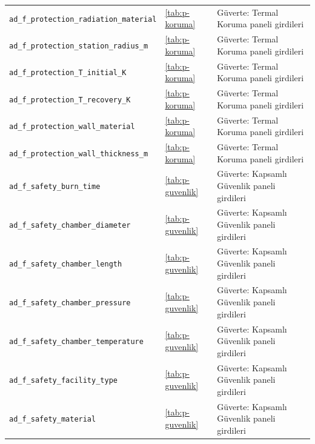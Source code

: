 \documentclass[11pt,a4paper]{article}
\begin{document}
{\begin{longtable}{@{}>{\raggedright\arraybackslash}p{5.2cm}p{1.4cm}>{\raggedright\arraybackslash}p{7.4cm}@{}}
\texttt{ad\_\allowbreak{}f\_\allowbreak{}protection\_\allowbreak{}radiation\_\allowbreak{}material} & \ref{tab:p-koruma} & Güverte: Termal Koruma paneli girdileri \\
\texttt{ad\_\allowbreak{}f\_\allowbreak{}protection\_\allowbreak{}station\_\allowbreak{}radius\_\allowbreak{}m} & \ref{tab:p-koruma} & Güverte: Termal Koruma paneli girdileri \\
\texttt{ad\_\allowbreak{}f\_\allowbreak{}protection\_\allowbreak{}T\_\allowbreak{}initial\_\allowbreak{}K} & \ref{tab:p-koruma} & Güverte: Termal Koruma paneli girdileri \\
\texttt{ad\_\allowbreak{}f\_\allowbreak{}protection\_\allowbreak{}T\_\allowbreak{}recovery\_\allowbreak{}K} & \ref{tab:p-koruma} & Güverte: Termal Koruma paneli girdileri \\
\texttt{ad\_\allowbreak{}f\_\allowbreak{}protection\_\allowbreak{}wall\_\allowbreak{}material} & \ref{tab:p-koruma} & Güverte: Termal Koruma paneli girdileri \\
\texttt{ad\_\allowbreak{}f\_\allowbreak{}protection\_\allowbreak{}wall\_\allowbreak{}thickness\_\allowbreak{}m} & \ref{tab:p-koruma} & Güverte: Termal Koruma paneli girdileri \\
\texttt{ad\_\allowbreak{}f\_\allowbreak{}safety\_\allowbreak{}burn\_\allowbreak{}time} & \ref{tab:p-guvenlik} & Güverte: Kapsamlı Güvenlik paneli girdileri \\
\texttt{ad\_\allowbreak{}f\_\allowbreak{}safety\_\allowbreak{}chamber\_\allowbreak{}diameter} & \ref{tab:p-guvenlik} & Güverte: Kapsamlı Güvenlik paneli girdileri \\
\texttt{ad\_\allowbreak{}f\_\allowbreak{}safety\_\allowbreak{}chamber\_\allowbreak{}length} & \ref{tab:p-guvenlik} & Güverte: Kapsamlı Güvenlik paneli girdileri \\
\texttt{ad\_\allowbreak{}f\_\allowbreak{}safety\_\allowbreak{}chamber\_\allowbreak{}pressure} & \ref{tab:p-guvenlik} & Güverte: Kapsamlı Güvenlik paneli girdileri \\
\texttt{ad\_\allowbreak{}f\_\allowbreak{}safety\_\allowbreak{}chamber\_\allowbreak{}temperature} & \ref{tab:p-guvenlik} & Güverte: Kapsamlı Güvenlik paneli girdileri \\
\texttt{ad\_\allowbreak{}f\_\allowbreak{}safety\_\allowbreak{}facility\_\allowbreak{}type} & \ref{tab:p-guvenlik} & Güverte: Kapsamlı Güvenlik paneli girdileri \\
\texttt{ad\_\allowbreak{}f\_\allowbreak{}safety\_\allowbreak{}material} & \ref{tab:p-guvenlik} & Güverte: Kapsamlı Güvenlik paneli girdileri \\

\end{longtable}}
\end{document}
